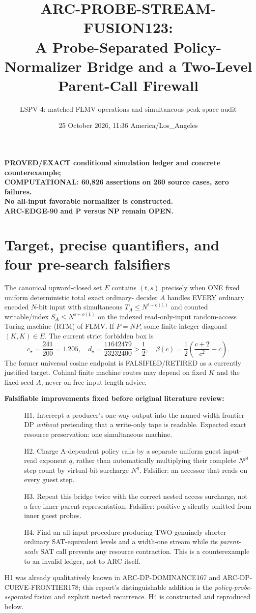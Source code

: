 \documentclass[11pt]{article}
\title{ARC-PROBE-STREAM-FUSION123:\\
A Probe-Separated Policy-Normalizer Bridge and a Two-Level Parent-Call Firewall}
\author{LSPV-4: matched FLMV operations and simultaneous peak-space audit}
\date{25 October 2026, 11:36 America/Los\_Angeles}
\newcommand{\SAT}{\mathsf{SAT}}
\begin{document}
\maketitle
\begin{center}
\textbf{PROVED/EXACT conditional simulation ledger and concrete counterexample;}\\
\textbf{COMPUTATIONAL: 60,826 assertions on 260 source cases, zero failures.}\\
\textbf{No all-input favorable normalizer is constructed.}\\
\textbf{ARC-EDGE-90 and P versus NP remain OPEN.}
\end{center}

\section{Target, precise quantifiers, and four pre-search falsifiers}
The canonical upward-closed set $E$ contains $(t,s)$ precisely when ONE
fixed uniform deterministic total exact ordinary-\SAT{} decider $A$
handles EVERY ordinary encoded $N$-bit input with simultaneous
$T_A\le N^{t+o(1)}$ and counted writable/index
$S_A\le N^{s+o(1)}$ on the indexed read-only-input
random-access Turing machine (RTM) of FLMV. If $P=NP$, some finite
integer diagonal $(K,K)\in E$. The current strict forbidden box is
\[
c_\star=\frac{241}{200}=1.205,\quad
d_\star=\frac{11642479}{23232400}>\frac12,\quad
\beta(c)=\frac12\left(\frac{c+2}{c^2}-c\right).
\]
The former universal cosine endpoint is FALSIFIED/RETIRED as a
currently justified target. Cohinal finite machine routes may depend
on fixed $K$ and the fixed seed $A$, never on free input-length advice.

\noindent\textbf{Falsifiable improvements fixed before original literature review:}
\begin{description}
\item[] H1. Intercept a producer's one-way output into the named-width
frontier DP \emph{without} pretending that a write-only tape is readable.
Expected exact resource preservation: one simultaneous machine.
\item[] H2. Charge A-dependent policy calls by a separate uniform
guest input-read exponent $q$, rather than automatically multiplying
their complete $N^{\rho t}$ step count by virtual-bit surcharge $N^g$.
Falsifier: an accessor that reads on every guest step.
\item[] H3. Repeat this bridge twice with the correct nested access
surcharge, not a free inner-parent representation.
Falsifier: positive $g$ silently omitted from inner guest probes.
\item[] H4. Find an all-input procedure producing TWO genuinely shorter
ordinary SAT-equivalent levels and a width-one stream while
its \emph{parent-scale} SAT call prevents any resource contraction.
This is a counterexample to an invalid ledger, not to ARC itself.
\end{description}
H1 was already qualitatively known in ARC-DP-DOMINANCE167 and
ARC-DP-CURVE-FRONTIER178; this report's distinguishable addition is
the \emph{policy-probe-separated} fusion and explicit nested recurrence.
H4 is constructed and reproduced below.
\end{document}
